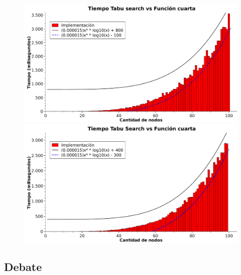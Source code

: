 \begin{figure}[htb]
\begin{minipage}{\textwidth}
\begin{center}
	\includegraphics[width=\textwidth]{./otros/graficos/tiempo_100nodos3_ej5.pdf}
	\caption{}
	\label{ej5tiempo3}
\end{center}
\end{minipage}

\begin{minipage}{\textwidth}
\begin{center}
	\includegraphics[width=\textwidth]{./otros/graficos/tiempo_100nodos4_ej5.pdf}
	\caption{}
	\label{ej5tiempo4}
\end{center}
\end{minipage}
\end{figure}
\clearpage

\subsection{Debate}
